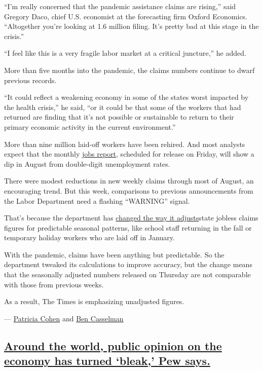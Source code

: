 ``I'm really concerned that the pandemic assistance claims are rising,''
said Gregory Daco, chief U.S. economist at the forecasting firm Oxford
Economics. ``Altogether you're looking at 1.6 million filing. It's
pretty bad at this stage in the crisis.''

``I feel like this is a very fragile labor market at a critical
juncture,'' he added.

More than five months into the pandemic, the claims numbers continue to
dwarf previous records.

``It could reflect a weakening economy in some of the states worst
impacted by the health crisis,'' he said, ``or it could be that some of
the workers that had returned are finding that it's not possible or
sustainable to return to their primary economic activity in the current
environment.''

More than nine million laid-off workers have been rehired. And most
analysts expect that the monthly \href{https://www.bls.gov/}{jobs
report}, scheduled for release on Friday, will show a dip in August from
double-digit unemployment rates.

There were modest reductions in new weekly claims through most of
August, an encouraging trend. But this week, comparisons to previous
announcements from the Labor Department need a flashing ``WARNING''
signal.

That's because the department has
\href{https://www.nytimes3xbfgragh.onion/live/2020/09/01/business/stock-market-today-coronavirus\#the-labor-department-will-start-counting-unemployment-claims-in-a-new-way}{changed
the way it adjusts}state jobless claims figures for predictable seasonal
patterns, like school staff returning in the fall or temporary holiday
workers who are laid off in January.

With the pandemic, claims have been anything but predictable. So the
department tweaked its calculations to improve accuracy, but the change
means that the seasonally adjusted numbers released on Thursday are not
comparable with those from previous weeks.

As a result, The Times is emphasizing unadjusted figures.

--- \href{https://www.nytimes3xbfgragh.onion/by/patricia-cohen}{Patricia
Cohen} and
\href{https://www.nytimes3xbfgragh.onion/by/ben-casselman}{Ben
Casselman}

\hypertarget{around-the-world-public-opinion-on-the-economy-has-turned-bleak-pew-says}{%
\subsection{\texorpdfstring{\protect\hyperlink{around-the-world-public-opinion-on-the-economy-has-turned-bleak-pew-says}{Around
the world, public opinion on the economy has turned `bleak,' Pew
says.}}{Around the world, public opinion on the economy has turned `bleak,' Pew says.}}\label{around-the-world-public-opinion-on-the-economy-has-turned-bleak-pew-says}}

